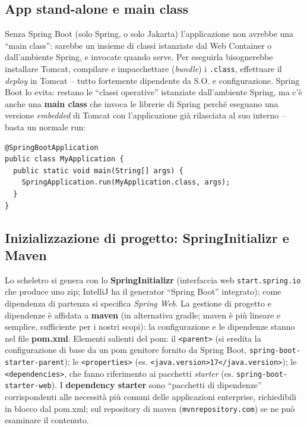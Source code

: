 \subsection{App stand-alone e main class}
Senza Spring Boot (solo Spring, o solo Jakarta) l'applicazione non avrebbe una ``main
class'': sarebbe un insieme di classi istanziate dal Web Container o dall'ambiente Spring, e
invocate quando serve. Per eseguirla bisognerebbe installare Tomcat, compilare e
impacchettare (\emph{bundle}) i \texttt{.class}, effettuare il \emph{deploy} in Tomcat --
tutto fortemente dipendente da S.O. e configurazione. Spring Boot lo evita: restano le
``classi operative'' istanziate dall'ambiente Spring, ma c'\`e anche una \textbf{main class}
che invoca le librerie di Spring perch\'e eseguano una versione \emph{embedded} di Tomcat con
l'applicazione gi\`a rilasciata al suo interno -- basta un normale run:
\begin{lstlisting}[style=java]
@SpringBootApplication
public class MyApplication {
  public static void main(String[] args) {
    SpringApplication.run(MyApplication.class, args);
  }
}
\end{lstlisting}

\subsection{Inizializzazione di progetto: SpringInitializr e Maven}
Lo scheletro si genera con lo \textbf{SpringInitializr} (interfaccia web \texttt{start.spring.io}
che produce uno zip; IntelliJ ha il generator ``Spring Boot'' integrato); come dipendenza di
partenza si specifica \emph{Spring Web}. La gestione di progetto e dipendenze \`e affidata a
\textbf{maven} (in alternativa gradle; maven \`e pi\`u lineare e semplice, sufficiente per i
nostri scopi): la configurazione e le dipendenze stanno nel file \textbf{pom.xml}.
Elementi salienti del pom: il \texttt{<parent>} (si eredita la configurazione di base da un
pom genitore fornito da Spring Boot, \texttt{spring-boot-starter-parent}); le
\texttt{<properties>} (es. \texttt{<java.version>17</java.version>}); le
\texttt{<dependencies>}, che fanno riferimento ai pacchetti \emph{starter}
(es. \texttt{spring-boot-starter-web}).
I \textbf{dependency starter} sono ``pacchetti di dipendenze'' corrispondenti alle
necessit\`a pi\`u comuni delle applicazioni enterprise, richiedibili in blocco dal pom.xml;
sul repository di maven (\texttt{mvnrepository.com}) se ne pu\`o esaminare il contenuto.

